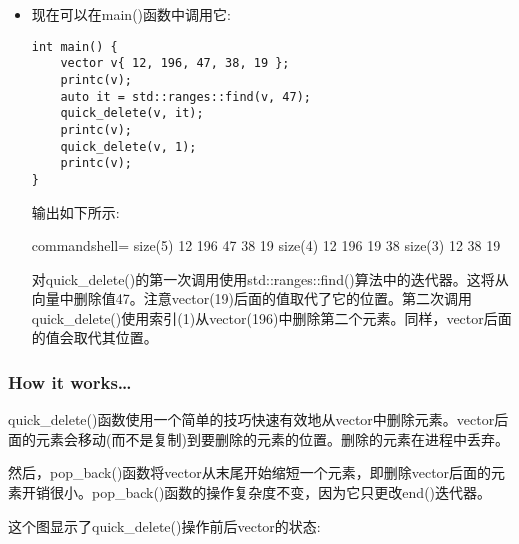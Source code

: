 \begin{itemize}
\item 
现在可以在main()函数中调用它:

\begin{lstlisting}[style=styleCXX]
int main() {
	vector v{ 12, 196, 47, 38, 19 };
	printc(v);
	auto it = std::ranges::find(v, 47);
	quick_delete(v, it);
	printc(v);
	quick_delete(v, 1);
	printc(v);
}
\end{lstlisting}

输出如下所示:

\begin{tcblisting}{commandshell={}}
size(5) 12 196 47 38 19
size(4) 12 196 19 38
size(3) 12 38 19
\end{tcblisting}

对quick\_delete()的第一次调用使用std::ranges::find()算法中的迭代器。这将从向量中删除值47。注意vector(19)后面的值取代了它的位置。第二次调用quick\_delete()使用索引(1)从vector(196)中删除第二个元素。同样，vector后面的值会取代其位置。
\end{itemize}

\subsubsection{How it works…}

quick\_delete()函数使用一个简单的技巧快速有效地从vector中删除元素。vector后面的元素会移动(而不是复制)到要删除的元素的位置。删除的元素在进程中丢弃。

然后，pop\_back()函数将vector从末尾开始缩短一个元素，即删除vector后面的元素开销很小。pop\_back()函数的操作复杂度不变，因为它只更改end()迭代器。

这个图显示了quick\_delete()操作前后vector的状态:

